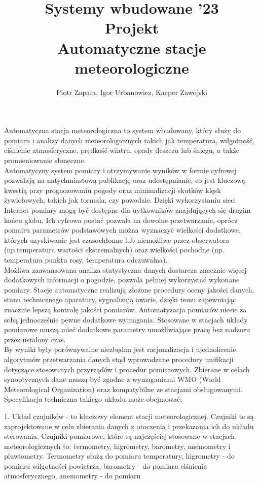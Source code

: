 \documentclass{article}
\title{Systemy wbudowane '23 \\ Projekt \\ Automatyczne stacje meteorologiczne}
\author{Piotr Zapała, Igor Urbanowicz, Kacper Zawojski}
\date{}
\begin{document}
\maketitle
\begin{center}
    \large Automatyczna stacja meteorologiczna to system wbudowany, który służy do pomiaru i analizy danych meteorologicznych takich jak temperatura, wilgotność, ciśnienie atmosferyczne, prędkość wiatru, opady deszczu lub śniegu, a także promieniowanie słoneczne.
    \\[0.5cm]
    Automatyczny system pomiary i otrzymywanie wyników w formie cyfrowej pozwalają na 
    natychmiastową publikację oraz udostępnianie, co jest kluczową kwestią przy 
    prognozowaniu pogody oraz minimalizacji skutków klęsk żywiołowych, takich jak tornada, czy powodzie.
    Dzięki wykorzystaniu sieci Internet pomiary mogą być dostępne dla uytkowników znajdujących się drugim
    końcu globu. Ich cyfrowa postać pozwala na dowolne przetwarzanie, oprócz pomairu parametrów podstawowych
    można wyznaczyć wielkości dodatkowe, których uzyskiwanie jest czasochłonne lub niemożliwe przez obserwatora (np.temperatura wartości ekstremalnych) oraz wielkości pochodne (np. temperatura punktu rosy, temperatura odczuwalna).
    \\[0.5cm]
    Możliwa zaawansowana analiza statystyczna danych dostarcza znacznie więcej 
    dodatkowych informacji o pogodzie, pozwala pełniej wykorzystać wykonane pomiary. Stacje automatyczne 
    realizują złożone procedury oceny jakości danych, stanu technicznego aparatury, sygnalizują awarie, 
    dzięki temu zapewniając znacznie lepszą kontrolę jakości pomiarów. Automatyzacja pomiarów niesie za sobą 
    jednocześnie pewne dodatkowe wymagania. Stosowane w stacjach układy pomiarowe muszą mieć dodatkowe 
    parametry umożliwiające pracę bez nadzoru przez ustalony czas.
    \\[0.5cm]
    By wyniki były porównywalne niezbędna jest racjonalizacja i ujednolicenie algorytmów przetwarzania danych stąd wprowadzane procedury unifikacji dotyczące stosowanych przyrządów i procedur pomiarowych. Zbierane w celach synoptycznych dane muszą być 
    zgodne z wymaganiami WMO (World Meteorological Organization) oraz kompatybilne ze stacjami obsługowanymi.
    \\[0.5cm]
    \newpage
    Specyfikacja techniczna takiego układu może obejmować:
    \begin{flushleft}
        1. Układ czujników - to kluczowy element stacji meteorologicznej. Czujniki te są zaprojektowane w celu zbierania danych z otoczenia i przekazania ich do układu sterowania. Czujniki pomiarowe, które są najczęściej stosowane w stacjach meteorologicznych to: termometry, higrometry, barometry, anemometry i pluwiometry. Termometry służą do pomiaru temperatury, higrometry - do pomiaru wilgotności powietrza, barometry - do pomiaru ciśnienia atmosferycznego, anemometry - do pomiaru 

\end{flushleft}
\end{center}
\end{document}
